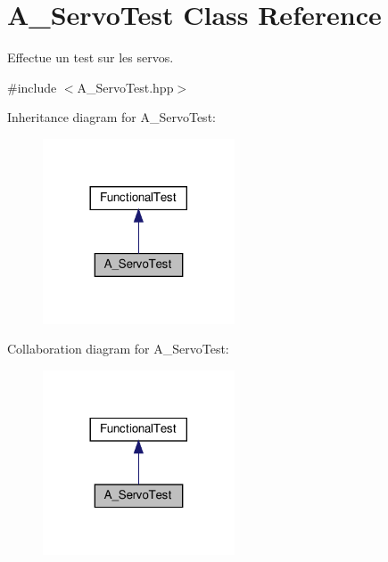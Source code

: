 \hypertarget{classA__ServoTest}{}\section{A\+\_\+\+Servo\+Test Class Reference}
\label{classA__ServoTest}


Effectue un test sur les servos.  




{\ttfamily \#include $<$A\+\_\+\+Servo\+Test.\+hpp$>$}



Inheritance diagram for A\+\_\+\+Servo\+Test\+:
\nopagebreak
\begin{figure}[H]
\begin{center}
\leavevmode
\includegraphics[width=161pt]{classA__ServoTest__inherit__graph}
\end{center}
\end{figure}


Collaboration diagram for A\+\_\+\+Servo\+Test\+:
\nopagebreak
\begin{figure}[H]
\begin{center}
\leavevmode
\includegraphics[width=161pt]{classA__ServoTest__coll__graph}
\end{center}
\end{figure}

